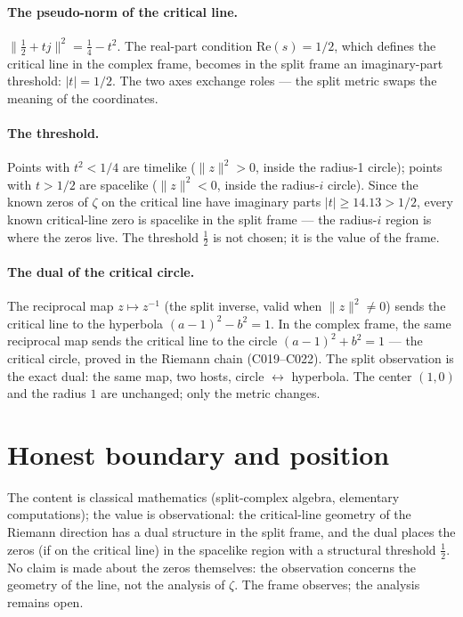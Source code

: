 \documentclass[sigplan,10pt,anonymous,review]{acmart}
\begin{document}
\paragraph{The pseudo-norm of the critical line.}
$\|\frac12 + tj\|^2 = \frac14 - t^2$. The real-part condition
$\mathrm{Re}(s) = 1/2$, which defines the critical line in the complex
frame, becomes in the split frame an imaginary-part threshold:
$|t| = 1/2$. The two axes exchange roles --- the split metric swaps the
meaning of the coordinates.

\paragraph{The threshold.} Points with $t^2 < 1/4$ are timelike
($\|z\|^2 > 0$, inside the radius-1 circle); points with $t > 1/2$ are
spacelike ($\|z\|^2 < 0$, inside the radius-$i$ circle). Since the known
zeros of $\zeta$ on the critical line have imaginary parts
$|t| \ge 14.13 > 1/2$, every known critical-line zero is spacelike in
the split frame --- the radius-$i$ region is where the zeros live. The
threshold $\frac12$ is not chosen; it is the value of the frame.

\paragraph{The dual of the critical circle.} The reciprocal map
$z \mapsto z^{-1}$ (the split inverse, valid when $\|z\|^2 \ne 0$) sends
the critical line to the hyperbola $(a-1)^2 - b^2 = 1$. In the complex
frame, the same reciprocal map sends the critical line to the circle
$(a-1)^2 + b^2 = 1$ --- the critical circle, proved in the Riemann chain
(C019--C022). The split observation is the exact dual: the same map,
two hosts, circle $\leftrightarrow$ hyperbola. The center $(1, 0)$ and
the radius $1$ are unchanged; only the metric changes.

\section{Honest boundary and position}

The content is classical mathematics (split-complex algebra, elementary
computations); the value is observational: the critical-line geometry of
the Riemann direction has a dual structure in the split frame, and the
dual places the zeros (if on the critical line) in the spacelike region
with a structural threshold $\frac12$. No claim is made about the zeros
themselves: the observation concerns the geometry of the line, not the
analysis of $\zeta$. The frame observes; the analysis remains open.
\end{document}
